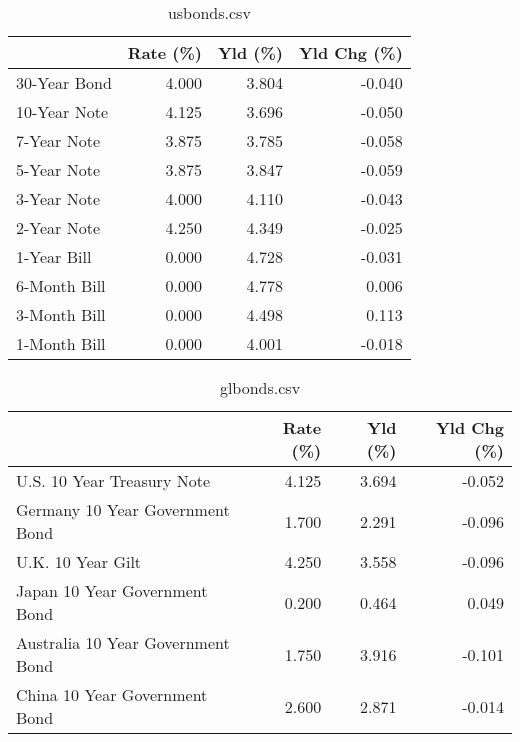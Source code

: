 \documentclass{article}%
\begin{document}
%


\begin{table}[htbp]%
\caption{usbonds.csv}%
\centering%
\begin{adjustbox}{width=1\textwidth}%
\begin{tabular}{lrrr}
\toprule
             &  Rate (\%) &  Yld (\%) &  Yld Chg (\%) \\
\midrule
30-Year Bond &     4.000 &    3.804 &       -0.040 \\
10-Year Note &     4.125 &    3.696 &       -0.050 \\
 7-Year Note &     3.875 &    3.785 &       -0.058 \\
 5-Year Note &     3.875 &    3.847 &       -0.059 \\
 3-Year Note &     4.000 &    4.110 &       -0.043 \\
 2-Year Note &     4.250 &    4.349 &       -0.025 \\
 1-Year Bill &     0.000 &    4.728 &       -0.031 \\
6-Month Bill &     0.000 &    4.778 &        0.006 \\
3-Month Bill &     0.000 &    4.498 &        0.113 \\
1-Month Bill &     0.000 &    4.001 &       -0.018 \\
\bottomrule
\end{tabular}
%
\end{adjustbox}%
\end{table}

%


\begin{table}[htbp]%
\caption{glbonds.csv}%
\centering%
\begin{adjustbox}{width=1\textwidth}%
\begin{tabular}{lrrr}
\toprule
                                  &  Rate (\%) &  Yld (\%) &  Yld Chg (\%) \\
\midrule
       U.S. 10 Year Treasury Note &     4.125 &    3.694 &       -0.052 \\
  Germany 10 Year Government Bond &     1.700 &    2.291 &       -0.096 \\
                U.K. 10 Year Gilt &     4.250 &    3.558 &       -0.096 \\
    Japan 10 Year Government Bond &     0.200 &    0.464 &        0.049 \\
Australia 10 Year Government Bond &     1.750 &    3.916 &       -0.101 \\
    China 10 Year Government Bond &     2.600 &    2.871 &       -0.014 \\
\bottomrule
\end{tabular}
%
\end{adjustbox}%
\end{table}
\end{document}
